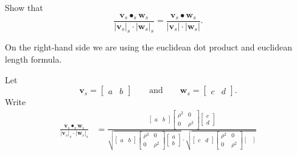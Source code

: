 \documentclass[newpage,hints,handout]{ximera}
\begin{document}
\begin{problem}
  Show that
  \[
  \frac{\mathbf{v}_s\bullet_s \mathbf{w}_s}{|\mathbf{v}_s|_s\cdot|\mathbf{w}_s|_s} = \frac{\mathbf{v}_s\bullet \mathbf{w}_s}{|\mathbf{v}_s|\cdot|\mathbf{w}_s|}.
  \]
  \begin{hint}
    On the right-hand side we are using the euclidean dot product and
    euclidean length formula.
  \end{hint}
    \begin{freeResponse}
    Let
      \[
      \mathbf{v}_s=
      \begin{bmatrix}
        a & b
      \end{bmatrix}
      \qquad\text{and}\qquad
      \mathbf{w}_s=
      \begin{bmatrix}
        c & d
      \end{bmatrix}.
      \]
      Write
      \begin{align*}
        \frac{\mathbf{v}_s\bullet_s \mathbf{w}_s}{|\mathbf{v}_s|_s\cdot|\mathbf{w}_s|_s} &= \frac{
          \begin{bmatrix}
            a & b
          \end{bmatrix}
          \begin{bmatrix}
            \rho^2 & 0 \\
            0 & \rho^2
          \end{bmatrix}
          \begin{bmatrix}
            c\\
            d
          \end{bmatrix}
        }{
          \sqrt{\begin{bmatrix}
            a & b
          \end{bmatrix}
          \begin{bmatrix}
            \rho^2 & 0 \\
            0 & \rho^2
          \end{bmatrix}
          \begin{bmatrix}
            a\\
            b
          \end{bmatrix}}
          \cdot
          \sqrt{\begin{bmatrix}
            c & d
          \end{bmatrix}
          \begin{bmatrix}
            \rho^2 & 0 \\
            0 & \rho^2
          \end{bmatrix}
          \begin{bmatrix}

\end{bmatrix}}}
\end{align*}
\end{freeResponse}
\end{problem}
\end{document}
